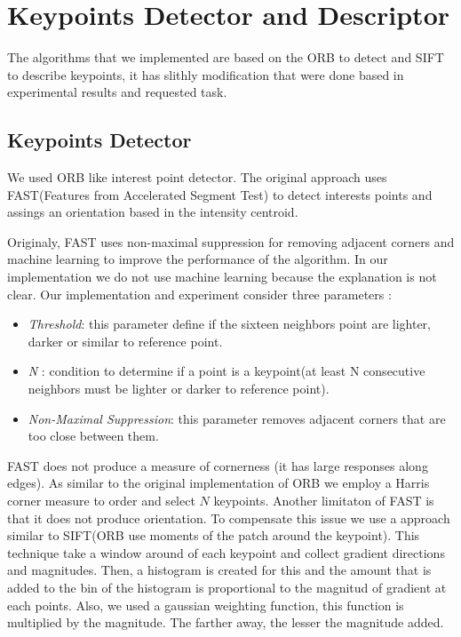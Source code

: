 \section{Keypoints Detector and Descriptor}

The algorithms that we implemented are based on the ORB to detect and SIFT to describe keypoints, it has slithly modification that were done based in experimental results and requested task.

\subsection{Keypoints Detector} 
We used ORB like interest point detector. The original approach uses FAST(Features from Accelerated Segment Test) to detect interests points and assings an orientation based in the intensity centroid. 

Originaly, FAST uses non-maximal suppression for removing adjacent corners and machine learning to improve the performance of the algorithm. In our implementation we do not use machine learning because the explanation is not clear. Our implementation and experiment consider three parameters : 
\begin{itemize}
	\item \textit{Threshold}: this parameter define if the sixteen neighbors point are lighter, darker or similar to reference point.
	\item \textit{N} : condition to determine if a point is a keypoint(at least N consecutive neighbors must be lighter or darker to reference point).
	\item \textit{Non-Maximal Suppression}: this parameter removes adjacent corners that are too close between them.
\end{itemize}

FAST does not produce a measure of cornerness (it has large responses along edges). As similar to the original implementation of ORB we employ a Harris corner measure to order and select $N$ keypoints. Another limitaton of FAST is that it does not produce orientation. To compensate this issue we use a approach similar to SIFT(ORB use moments of the patch around the keypoint). This technique take a window around of each keypoint and collect gradient directions and magnitudes. Then, a histogram is created for this and the amount that is added to the bin of the histogram is proportional to the magnitud of gradient at each points. Also, we used a gaussian weighting function, this function is multiplied by the magnitude. The farther away, the lesser the magnitude added.

